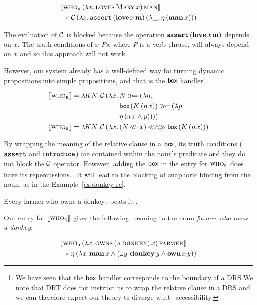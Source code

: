 \begin{align*}
& \llbracket \textsc{who}_{\textsc{r}}\,(\lambda x.\, \textsc{loves}\,\textsc{Mary}\,x)\,\textsc{man} \rrbracket \\
& \twoheadrightarrow \mathcal{C}\,(\lambda x.\, \mathtt{assert}\,(\textbf{love}\,x\,\textbf{m})\,(\lambda \_.\, \eta\,(\textbf{man}\,x)))
\end{align*}

The evaluation of $\mathcal{C}$ is blocked because the operation
$\mathtt{assert}\,(\textbf{love}\,x\,\textbf{m})$ depends on $x$. The
truth conditions of \emph{$x$ $P$s}, where $P$ is a verb phrase, will
always depend on $x$ and so this approach will not work.

However, our system already has a well-defined way for turning dynamic
propositions into simple propositions, and that is the $\textsf{box}$ handler.

\begin{align*}
  \sem{\abs{who}_{\abs{r}}} = \lam{K N}{\ap{\CC}{(\lam{x}{
    &N \hsbind (\lam{n}{ \\
    &\ap{\BOX}{(\ap{K}{(\etaE{x})})} \hsbind (\lam{p}{ \\
    &\etaE{(\ap{n}{x} \land p)}})})})}} \\
  \sem{\abs{who}_{\abs{r}}} = \lam{K N}{\ap{\CC}{(\lam{x}{
    &(N \apl x) \andlr \ap{\BOX}{(\ap{K}{(\etaE{x})})}})}}
\end{align*}

By wrapping the meaning of the relative clause in a $\textsf{box}$, its truth
conditions ($\mathtt{assert}$ and $\mathtt{introduce}$) are contained within the
noun's predicate and they do not block the $\mathcal{C}$ operator. However, adding
the $\textsf{box}$ in the entry for $\textsc{who}_{\textsc{r}}$ does have its
repercussions.\footnote{We have seen that the $\textsf{box}$ handler corresponds to
  the boundary of a DRS.\@ We note that DRT does not instruct us to wrap
  the relative clause in a DRS and we can therefore expect our theory to
  diverge w.r.t.\ accessibility.} It will lead to the blocking of anaphoric
binding from the noun, as in the Example~\ref{ex:donkey-rc}.

\begin{exe}
   Every farmer who owns a donkey$_1$ beats it$_1$.
\end{exe}

Our entry for $\llbracket \textsc{who}_{\textsc{r}} \rrbracket$ gives the following meaning to
the noun \emph{farmer who owns a donkey}:

\begin{align*}
& \llbracket \textsc{who}_{\textsc{r}}\,(\lambda x.\, \textsc{owns}\,(\textsc{a}\,\textsc{donkey})\,x)\,\textsc{farmer} \rrbracket \\
& \twoheadrightarrow \eta\,(\lambda x.\, \textbf{man}\,x \land (\exists y.\, \textbf{donkey}\,y \land \textbf{own}\,x\,y))
\end{align*}

